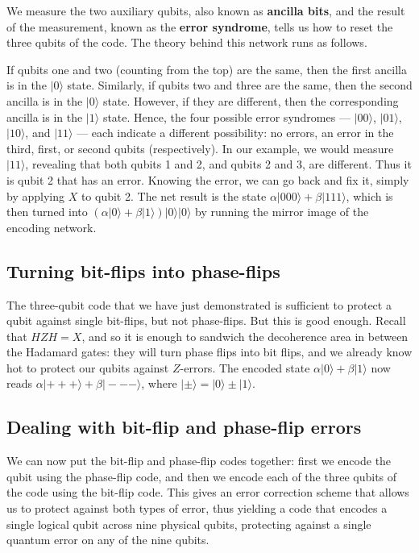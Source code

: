 \documentclass{article}
\begin{document}
We measure the two auxiliary qubits, also known as \textbf{ancilla bits}, and the result of the measurement, known as the \textbf{error syndrome}, tells us how to reset the three qubits of the code.
The theory behind this network runs as follows.

If qubits one and two (counting from the top) are the same, then the first ancilla is in the \(|0\rangle\) state.
Similarly, if qubits two and three are the same, then the second ancilla is in the \(|0\rangle\) state.
However, if they are different, then the corresponding ancilla is in the \(|1\rangle\) state.
Hence, the four possible error syndromes --- \(|00\rangle\), \(|01\rangle\), \(|10\rangle\), and \(|11\rangle\) --- each indicate a different possibility: no errors, an error in the third, first, or second qubits (respectively).
In our example, we would measure \(|11\rangle\), revealing that both qubits 1 and 2, and qubits 2 and 3, are different.
Thus it is qubit 2 that has an error.
Knowing the error, we can go back and fix it, simply by applying \(X\) to qubit 2.
The net result is the state \(\alpha|000\rangle + \beta|111\rangle\), which is then turned into \((\alpha|0\rangle + \beta|1\rangle)|0\rangle|0\rangle\) by running the mirror image of the encoding network.

\hypertarget{turning-bit-flips-into-phase-flips}{%
\subsection{Turning bit-flips into phase-flips}\label{turning-bit-flips-into-phase-flips}}

The three-qubit code that we have just demonstrated is sufficient to protect a qubit against single bit-flips, but not phase-flips.
But this is good enough.
Recall that \(HZH=X\), and so it is enough to sandwich the decoherence area in between the Hadamard gates: they will turn phase flips into bit flips, and we already know hot to protect our qubits against \(Z\)-errors.
The encoded state \(\alpha|0\rangle + \beta|1\rangle\) now reads \(\alpha|+++\rangle+\beta|---\rangle\), where \(|\pm\rangle=|0\rangle\pm|1\rangle\).

\hypertarget{dealing-with-bit-flip-and-phase-flip-errors}{%
\subsection{Dealing with bit-flip and phase-flip errors}\label{dealing-with-bit-flip-and-phase-flip-errors}}

We can now put the bit-flip and phase-flip codes together: first we encode the qubit using the phase-flip code, and then we encode each of the three qubits of the code using the bit-flip code.
This gives an error correction scheme that allows us to protect against both types of error, thus yielding a code that encodes a single logical qubit across nine physical qubits, protecting against a single quantum error on any of the nine qubits.
\end{document}
